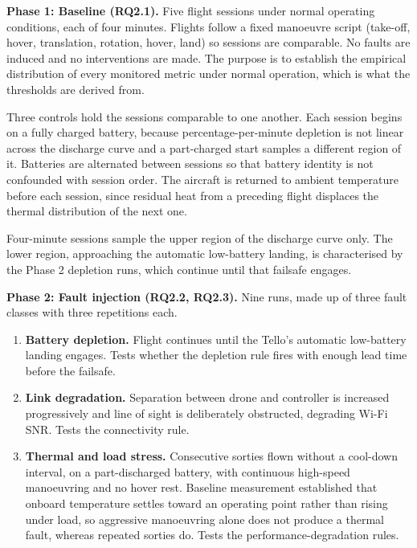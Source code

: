 \noindent\textbf{Phase 1: Baseline (RQ2.1).} Five flight sessions under normal
operating conditions, each of four minutes. Flights follow a fixed manoeuvre
script (take-off, hover, translation, rotation, hover, land) so sessions are
comparable. No faults are induced and no interventions are made. The purpose is
to establish the empirical distribution of every monitored metric under normal
operation, which is what the thresholds are derived from.

Three controls hold the sessions comparable to one another. Each session begins
on a fully charged battery, because percentage-per-minute depletion is not
linear across the discharge curve and a part-charged start samples a different
region of it. Batteries are alternated between sessions so that battery identity
is not confounded with session order. The aircraft is returned to ambient
temperature before each session, since residual heat from a preceding flight
displaces the thermal distribution of the next one.

Four-minute sessions sample the upper region of the discharge curve only. The
lower region, approaching the automatic low-battery landing, is characterised by
the Phase 2 depletion runs, which continue until that failsafe engages.

\noindent\textbf{Phase 2: Fault injection (RQ2.2, RQ2.3).} Nine runs, made up of
three fault classes with three repetitions each.

\begin{enumerate}
    \item \textbf{Battery depletion.} Flight continues until the Tello's
    automatic low-battery landing engages. Tests whether the depletion rule fires
    with enough lead time before the failsafe.
    \item \textbf{Link degradation.} Separation between drone and controller is
    increased progressively and line of sight is deliberately obstructed,
    degrading Wi-Fi SNR. Tests the connectivity rule.
    \item \textbf{Thermal and load stress.} Consecutive sorties flown without a
    cool-down interval, on a part-discharged battery, with continuous high-speed
    manoeuvring and no hover rest. Baseline measurement established that onboard
    temperature settles toward an operating point rather than rising under load,
    so aggressive manoeuvring alone does not produce a thermal fault, whereas
    repeated sorties do. Tests the performance-degradation rules.
\end{enumerate}

